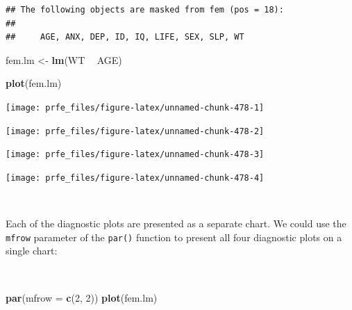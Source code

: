 \documentclass[12pt,a4paper]{book}
\newenvironment{Shaded}{\begin{snugshade}}{\end{snugshade}}
\newcommand{\KeywordTok}[1]{\textcolor[rgb]{0.13,0.29,0.53}{\textbf{#1}}}
\newcommand{\DataTypeTok}[1]{\textcolor[rgb]{0.13,0.29,0.53}{#1}}
\newcommand{\DecValTok}[1]{\textcolor[rgb]{0.00,0.00,0.81}{#1}}
\newcommand{\StringTok}[1]{\textcolor[rgb]{0.31,0.60,0.02}{#1}}
\newcommand{\OperatorTok}[1]{\textcolor[rgb]{0.81,0.36,0.00}{\textbf{#1}}}
\newcommand{\NormalTok}[1]{#1}
\theoremstyle{definition}
\theoremstyle{definition}
\theoremstyle{definition}
\theoremstyle{remark}
\begin{document}
\begin{verbatim}
## The following objects are masked from fem (pos = 18):
## 
##     AGE, ANX, DEP, ID, IQ, LIFE, SEX, SLP, WT
\end{verbatim}

\begin{Shaded}
\begin{Highlighting}[]
\NormalTok{fem.lm <-}\StringTok{ }\KeywordTok{lm}\NormalTok{(WT }\OperatorTok{~}\StringTok{ }\NormalTok{AGE)}
\end{Highlighting}
\end{Shaded}

\newpage

\begin{Shaded}
\begin{Highlighting}[]
\KeywordTok{plot}\NormalTok{(fem.lm)}
\end{Highlighting}
\end{Shaded}

\begin{center}\texttt{[image: prfe\_files/figure-latex/unnamed-chunk-478-1]} \end{center}

\begin{center}\texttt{[image: prfe\_files/figure-latex/unnamed-chunk-478-2]} \end{center}

\begin{center}\texttt{[image: prfe\_files/figure-latex/unnamed-chunk-478-3]} \end{center}

\begin{center}\texttt{[image: prfe\_files/figure-latex/unnamed-chunk-478-4]} \end{center}

~

Each of the diagnostic plots are presented as a separate chart. We could
use the \texttt{mfrow} parameter of the \texttt{par()} function to
present all four diagnostic plots on a single chart:

~

\begin{Shaded}
\begin{Highlighting}[]
\KeywordTok{par}\NormalTok{(}\DataTypeTok{mfrow =} \KeywordTok{c}\NormalTok{(}\DecValTok{2}\NormalTok{, }\DecValTok{2}\NormalTok{))}
\KeywordTok{plot}\NormalTok{(fem.lm)}
\end{Highlighting}
\end{Shaded}
\end{document}

